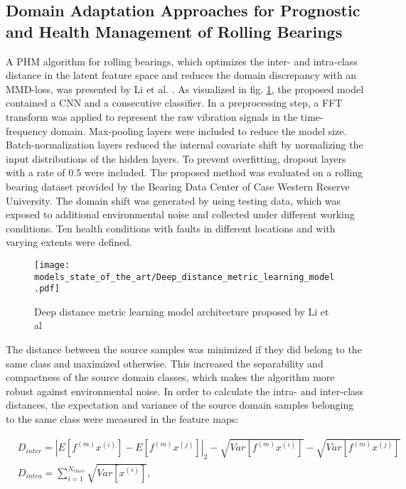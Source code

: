 \subsection{Domain Adaptation Approaches for Prognostic and Health Management of Rolling Bearings}

A PHM algorithm for rolling bearings, which optimizes the inter- and intra-class distance in the latent feature space and reduces the domain discrepancy with an MMD-loss, was presented by Li et al. \cite{Li2018}. As visualized in fig. \ref{fig:Deep_distance_metric_learning_model}, the proposed model contained a CNN and a consecutive classifier. In a preprocessing step, a FFT transform was applied to represent the raw vibration signals in the time-frequency domain. Max-pooling layers were included to reduce the model size. Batch-normalization layers reduced the internal covariate shift by normalizing the input distributions of the hidden layers. To prevent overfitting, dropout layers with a rate of 0.5 were included. The proposed method was evaluated on a rolling bearing dataset provided by the Bearing Data Center of Case Western Reserve University. The domain shift was generated by using testing data, which was exposed to additional environmental noise and collected under different working conditions. Ten health conditions with faults in different locations and with varying extents were defined. 

\begin{figure}[H]
  \centering
  \texttt{[image: models\_state\_of\_the\_art/Deep\_distance\_metric\_learning\_model.pdf]}
  \caption{Deep distance metric learning model architecture proposed by Li et al \cite{Li2018}}
  \label{fig:Deep_distance_metric_learning_model}
\end{figure}

The distance between the source samples was minimized if they did belong to the same class and maximized otherwise. This increased the separability and compactness of the source domain classes, which makes the algorithm more robust against environmental noise. In order to calculate the intra- and inter-class distances, the expectation and variance of the source domain samples belonging to the same class were measured in the feature maps:

\begin{equation}
    \begin{aligned}
       &D_{inter} = |E[f^{(m)}x^{(i)}]-E[f^{(m)}x^{(j)}]|_{2}-\sqrt{Var[f^{(m)}x^{(i)}]}-\sqrt{Var[f^{(m)}x^{(j)}]}\\
       &D_{intra} = 
        \sum_{i=1}^{N_{class}} \sqrt{Var[x^{(i)}]},
    \end{aligned}
\end{equation}

